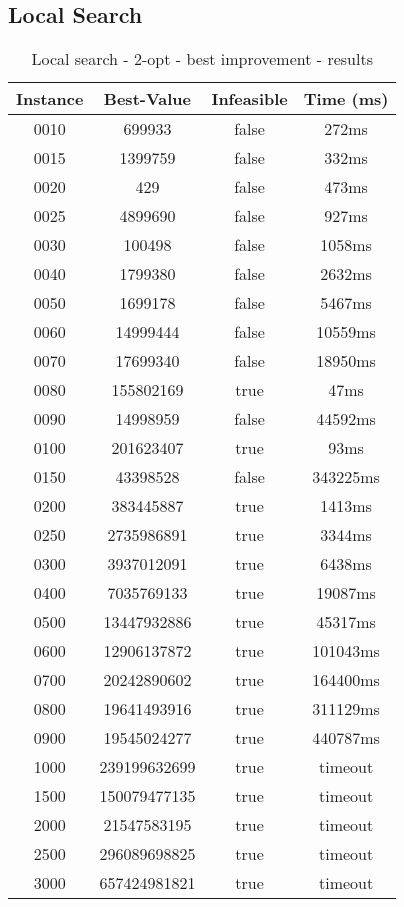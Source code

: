 \subsection*{Local Search}
\begin{table}[H]
	\centering
	\begin{tabular}{|| c | c | c | c ||} 
		\hline
		Instance & Best-Value & Infeasible & Time (ms) \\
		\hline\hline
		0010 & 699933 & false & 272ms \\
		0015 & 1399759 & false & 332ms \\
		0020 & 429 & false & 473ms \\
		0025 & 4899690 & false & 927ms \\
		0030 & 100498 & false & 1058ms \\
		0040 & 1799380 & false & 2632ms \\
		0050 & 1699178 & false & 5467ms \\
		0060 & 14999444 & false & 10559ms \\
		0070 & 17699340 & false & 18950ms \\
		0080 & 155802169 & true & 47ms \\
		0090 & 14998959 & false & 44592ms \\
		0100 & 201623407 & true & 93ms \\
		0150 & 43398528 & false & 343225ms \\
		0200 & 383445887 & true & 1413ms \\
		0250 & 2735986891 & true & 3344ms \\
		0300 & 3937012091 & true & 6438ms \\
		0400 & 7035769133 & true & 19087ms \\
		0500 & 13447932886 & true & 45317ms \\
		0600 & 12906137872 & true & 101043ms \\
		0700 & 20242890602 & true & 164400ms \\
		0800 & 19641493916 & true & 311129ms \\
		0900 & 19545024277 & true & 440787ms \\
		1000 & 239199632699 & true & timeout \\
		1500 & 150079477135 & true & timeout \\
		2000 & 21547583195 & true & timeout \\
		2500 & 296089698825 & true & timeout \\
		3000 & 657424981821 & true & timeout \\
		\hline
	\end{tabular}
	\caption{Local search - 2-opt - best improvement - results}
\end{table}

